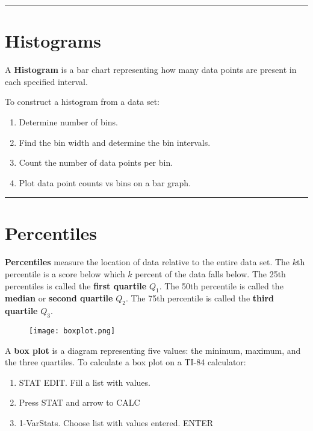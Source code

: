 \documentclass{article}
\theoremstyle{definition}
\newcommand{\secend}[0]{\noindent\rule[0.5ex]{\linewidth}{1pt}}
\begin{document}
\secend

\section{Histograms}
\begin{definition}
    A \textbf{Histogram} is a bar chart representing how many data points are
    present in each specified interval.
\end{definition}

\noindent To construct a histogram from a data set:
\begin{enumerate}
    \item Determine number of bins.
    \item Find the bin width and determine the bin intervals.
    \item Count the number of data points per bin.
    \item Plot data point counts vs bins on a bar graph.
\end{enumerate}

\secend

\section{Percentiles}
\begin{definition}
    \textbf{Percentiles} measure the location of data relative to the entire
    data set. The $k$th percentile is a score below which $k$ percent of the
    data falls below.
    \tcblower
    The 25th percentiles is called the \textbf{first quartile} $Q_1$. The 50th
    percentile is called the \textbf{median} or \textbf{second quartile} $Q_2$.
    The 75th percentile is called the \textbf{third quartile} $Q_3$.
\end{definition}

\begin{figure}[h]
    \centering
    \texttt{[image: boxplot.png]}
\end{figure}

\begin{definition}
    A \textbf{box plot} is a diagram representing five values: the minimum,
    maximum, and the three quartiles.
    \tcblower
    To calculate a box plot on a TI-84 calculator:
    \begin{enumerate}
        \item STAT EDIT. Fill a list with values. 
        \item Press STAT and arrow to CALC
        \item 1-VarStats. Choose list with values entered. ENTER 
    \end{enumerate}
\end{definition}
\end{document}
